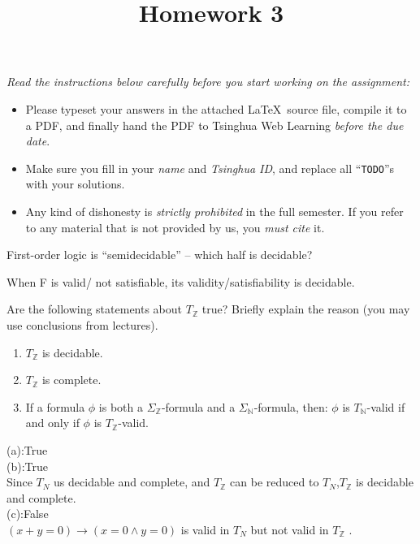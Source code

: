 \documentclass[11pt,a4paper]{article}
\title{Homework 3}
\newcommand{\nat}{\mathbb{N}}
\renewcommand{\int}{\mathbb{Z}}
\begin{document}
\maketitle

\textit{Read the instructions below carefully before you start working on the assignment:}
\begin{itemize}
    \item Please typeset your answers in the attached \LaTeX~source file, compile it to a PDF,
    and finally hand the PDF to Tsinghua Web Learning \emph{before the due date}.
    \item Make sure you fill in your \emph{name} and \emph{Tsinghua ID},
    and replace all ``\texttt{TODO}''s with your solutions.
    \item Any kind of dishonesty is \emph{strictly prohibited} in the full semester.
    If you refer to any material that is not provided by us, you \emph{must cite} it.
\end{itemize}



\subproblem First-order logic is ``semidecidable'' -- which half is decidable?

\begin{solution}
    When F is valid/ not satisfiable, its validity/satisfiability is decidable.
\end{solution}

\subproblem Are the following statements about $T_\int$ true? Briefly explain the reason (you may use conclusions from lectures).

\begin{enumerate}[label=(\alph*)]
    \item $T_\int$ is decidable.
    \item $T_\int$ is complete.
    \item If a formula $\phi$ is both a $\Sigma_\int$-formula and a $\Sigma_\nat$-formula, then: $\phi$ is $T_\nat$-valid if and only if $\phi$ is $T_\int$-valid.
\end{enumerate}

\begin{solution}
    (a):True\\
    (b):True\\
    Since $T_{N}$ us decidable and complete, and $T_\int$ can be reduced to $T_{N}$,$T_\int$ is decidable and complete.  \\
    (c):False\\
    $(x + y = 0) \to (x = 0 \land y = 0)$ is valid in $T_{N}$  but not valid in $T_{\int}$ .

\end{solution}
\end{document}
